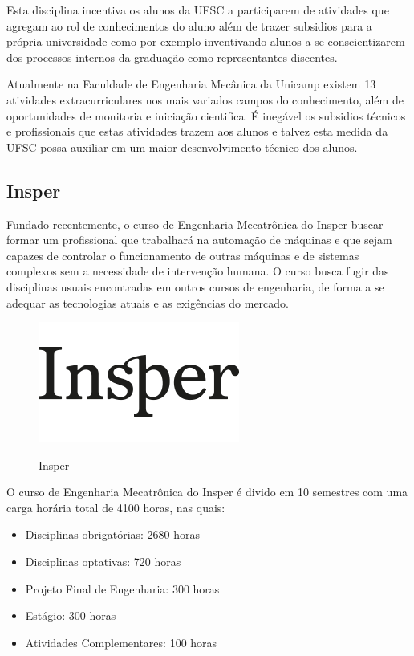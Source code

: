 \documentclass[12pt]{article} %
\begin{document}
Esta disciplina incentiva os alunos da UFSC a participarem de atividades que agregam ao rol de conhecimentos do aluno além de trazer subsidios para a própria universidade como por exemplo inventivando alunos a se conscientizarem dos processos internos da graduação como representantes discentes.

Atualmente na Faculdade de Engenharia Mecânica da Unicamp existem 13 atividades extracurriculares nos mais variados campos do conhecimento, além de oportunidades de monitoria e iniciação cientifica. É inegável os subsidios técnicos e profissionais que estas atividades trazem aos alunos e talvez esta medida da UFSC possa auxiliar em um maior desenvolvimento técnico dos alunos.


\subsection{Insper}

Fundado recentemente, o curso de Engenharia Mecatrônica do Insper buscar formar um profissional que trabalhará na automação de máquinas e que sejam capazes de controlar o funcionamento de outras máquinas e de sistemas complexos
sem a necessidade de intervenção humana. O curso busca fugir das disciplinas usuais encontradas em outros cursos de engenharia, de forma a se adequar as tecnologias atuais e as exigências do mercado.

\begin{figure}[H]
\centering
\includegraphics[scale=0.3]{pictures/insperLogo.png}\\
\caption{Insper}
\end{figure}

O curso de Engenharia Mecatrônica do Insper é divido em 10 semestres com uma carga horária total de 4100 horas, nas quais:

\begin{itemize}
\item Disciplinas obrigatórias: 2680 horas
\item Disciplinas optativas: 720 horas
\item Projeto Final de Engenharia: 300 horas
\item Estágio: 300 horas
\item Atividades Complementares: 100 horas
\end{itemize}
\end{document}
